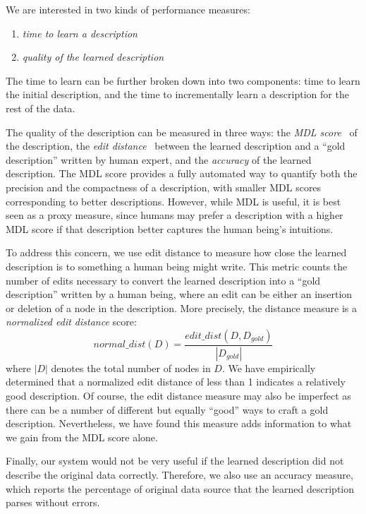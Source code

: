 We are interested in two kinds of performance measures: 
\begin{enumerate}
\item {\em time to learn a description} 
\item {\em quality of the learned description} 
\end{enumerate}

The time to learn can be further
broken down into two components: time to learn the initial description,
and the time to incrementally learn a description for the rest of the data.

The quality of the description can be measured in three ways:
the {\em MDL score}~\cite{mdlbook} of the description, the {\em edit distance}~\cite{Bille05:EditDistance} between the learned
description and a ``gold description'' written by human expert, and the {\em accuracy}
of the learned description.  The MDL score 
provides a fully automated way to quantify both the
precision and the compactness of a description, with smaller MDL scores corresponding to better descriptions.
However, while MDL is useful, it is best seen as a proxy measure, since humans may prefer a description with a higher MDL score if that description better captures the human being's intuitions. 


To address this concern, we use edit distance to measure how close the learned description is to something a human being might write.
This metric counts the number of edits necessary to convert the learned description into a ``gold description'' written by a human being, where an edit can be either an insertion or deletion of a node in the description. 
More precisely, the distance measure is a {\em normalized edit distance} score:
\[normal\_dist(D) = \frac{edit\_dist(D, D_{gold})}{|D_{gold}|}\]
where $|D|$ denotes the total number of nodes in $D$.
We have empirically determined that a normalized edit distance of 
less than 1 indicates a relatively good description. 
Of course, the edit distance measure may also be imperfect as there can be a number of different but equally ``good'' ways 
to craft a gold description.  Nevertheless, we have found this measure
adds information to what we gain from the MDL score alone.

Finally, our system would not be very useful if the learned description 
did not describe the original data correctly. Therefore, we also use an accuracy measure, 
which reports the percentage of original data source that the 
learned description parses without errors.


